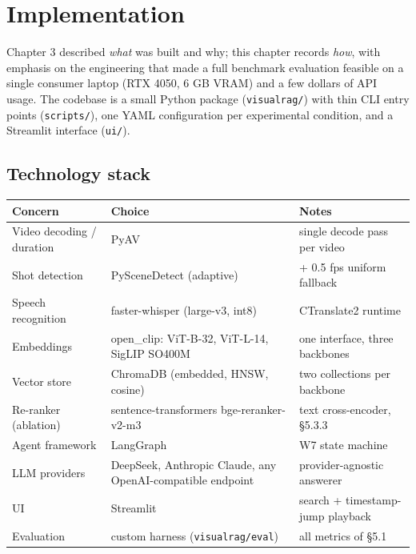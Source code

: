 \chapter{Implementation}

Chapter 3 described \emph{what} was built and why; this chapter records
\emph{how}, with emphasis on the engineering that made a full benchmark
evaluation feasible on a single consumer laptop (RTX 4050, 6 GB VRAM)
and a few dollars of API usage. The codebase is a small Python package
(\texttt{visualrag/}) with thin CLI entry points (\texttt{scripts/}),
one YAML configuration per experimental condition, and a Streamlit
interface (\texttt{ui/}).

\section{Technology stack}

\begin{longtable}[]{@{}
  >{\raggedright\arraybackslash}p{}
  >{\raggedright\arraybackslash}p{}
  >{\raggedright\arraybackslash}p{}@{}}
\toprule\noalign{}
\begin{minipage}[b]{\linewidth}\raggedright
Concern
\end{minipage} & \begin{minipage}[b]{\linewidth}\raggedright
Choice
\end{minipage} & \begin{minipage}[b]{\linewidth}\raggedright
Notes
\end{minipage} \\
\midrule\noalign{}
\endhead
\bottomrule\noalign{}
\endlastfoot
Video decoding / duration & PyAV & single decode pass per video \\
Shot detection & PySceneDetect (adaptive) & + 0.5 fps uniform
fallback \\
Speech recognition & faster-whisper (large-v3, int8) & CTranslate2
runtime \\
Embeddings & open\_clip: ViT-B-32, ViT-L-14, SigLIP SO400M & one
interface, three backbones \\
Vector store & ChromaDB (embedded, HNSW, cosine) & two collections per
backbone \\
Re-ranker (ablation) & sentence-transformers bge-reranker-v2-m3 & text
cross-encoder, §5.3.3 \\
Agent framework & LangGraph & W7 state machine \\
LLM providers & DeepSeek, Anthropic Claude, any OpenAI-compatible
endpoint & provider-agnostic answerer \\
UI & Streamlit & search + timestamp-jump playback \\
Evaluation & custom harness (\texttt{visualrag/eval}) & all metrics of
§5.1 \\
\end{longtable}

